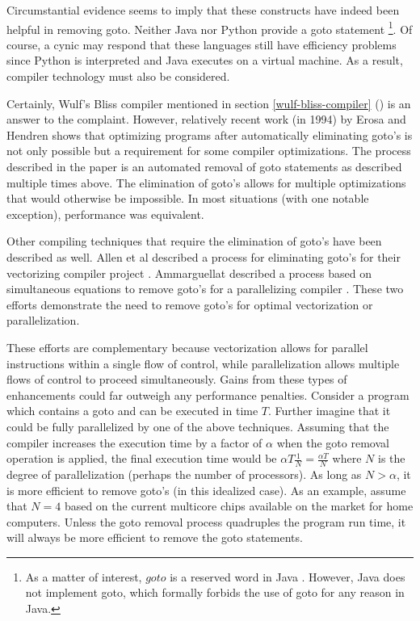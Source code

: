 \documentclass[letterpaper,12pt]{article}
\newcommand{\fullref}[1]{section \ref{#1} (\emph{\nameref{#1}})}
\begin{document}
Circumstantial evidence seems to imply that these constructs have indeed been
helpful in removing goto.  Neither Java nor Python provide a goto statement
\footnote{As a matter of interest, $goto$ is a reserved word in Java
\cite{java_keywords}.  However, Java does not implement goto,
which formally forbids the use of goto for any reason in Java.}.
Of course, a cynic may respond that these languages still have
efficiency problems since Python is interpreted and Java executes on a virtual
machine.  As a result, compiler technology must also be considered.

Certainly, Wulf's Bliss compiler mentioned in \fullref{wulf-bliss-compiler} is
an answer to the complaint.  However, relatively recent work (in 1994) by Erosa
and Hendren \cite{erosa} shows that optimizing programs after automatically
eliminating goto's is not only possible but a requirement for some compiler
optimizations.  The process described in the paper is an automated removal
of goto statements as described multiple times above.  The elimination of goto's
allows for multiple optimizations that would otherwise be impossible.  In most
situations (with one notable exception), performance was equivalent.

Other compiling techniques that require the elimination of goto's have been
described as well.  Allen et al described a process for eliminating
goto's for their vectorizing compiler project \cite{allen}.  Ammarguellat
described a process based on simultaneous equations to remove goto's for a
parallelizing compiler \cite{ammarguellat}.  These two efforts demonstrate
the need to remove goto's for optimal vectorization or parallelization.

These efforts are complementary because vectorization allows for parallel
instructions within a single flow of control, while parallelization allows
multiple flows of control to proceed simultaneously.  Gains from these types of
enhancements could far outweigh any performance penalties.  Consider a program
which contains a goto and can be executed in time $T$.  Further imagine that it
could be fully parallelized by one of the above techniques.  Assuming that
the compiler increases the execution time by a factor of $\alpha$ when the goto
removal operation is applied, the final execution time would be
$\alpha T \frac{1}{N} = \frac{\alpha T}{N}$ where $N$ is the degree of
parallelization (perhaps the number of processors).  As long as $N > \alpha$,
it is more efficient to remove goto's (in this idealized case).  As an example,
assume that $N = 4$ based on the current multicore chips available on the market
for home computers.  Unless the goto removal process quadruples the program run
time, it will always be more efficient to remove the goto statements.
\end{document}
